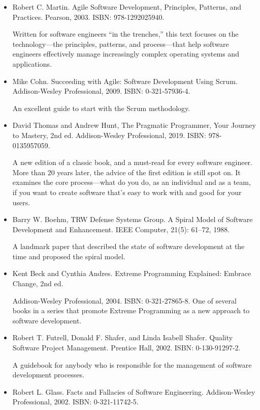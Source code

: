 \begin{itemize}
\item
Robert C. Martin. Agile Software Development, Principles, Patterns, and Practices. Pearson, 2003. ISBN: 978-1292025940.

Written for software engineers “in the trenches,” this text focuses on the technology—the principles, patterns, and process—that help software engineers effectively manage increasingly complex operating systems and applications.

\item
Mike Cohn. Succeeding with Agile: Software Development Using Scrum. Addison-Wesley Professional, 2009. ISBN: 0-321-57936-4.

An excellent guide to start with the Scrum methodology.

\item
David Thomas and Andrew Hunt, The Pragmatic Programmer, Your Journey to Mastery, 2nd ed. Addison-Wesley Professional, 2019. ISBN: 978-0135957059.

A new edition of a classic book, and a must-read for every software engineer. More than 20 years later, the advice of the first edition is still spot on. It examines the core process—what do you do, as an individual and as a team, if you want to create software that’s easy to work with and good for your users.

\item
Barry W. Boehm, TRW Defense Systems Group. A Spiral Model of Software Development and Enhancement. IEEE Computer, 21(5): 61–72, 1988.

A landmark paper that described the state of software development at the time and proposed the spiral model.

\item
Kent Beck and Cynthia Andres. Extreme Programming Explained: Embrace Change, 2nd ed.

Addison-Wesley Professional, 2004. ISBN: 0-321-27865-8.
One of several books in a series that promote Extreme Programming as a new approach to software development.

\item
Robert T. Futrell, Donald F. Shafer, and Linda Isabell Shafer. Quality Software Project Management. Prentice Hall, 2002. ISBN: 0-130-91297-2.

A guidebook for anybody who is responsible for the management of software development processes.

\item
Robert L. Glass. Facts and Fallacies of Software Engineering. Addison-Wesley Professional, 2002. ISBN: 0-321-11742-5.


\end{itemize}

